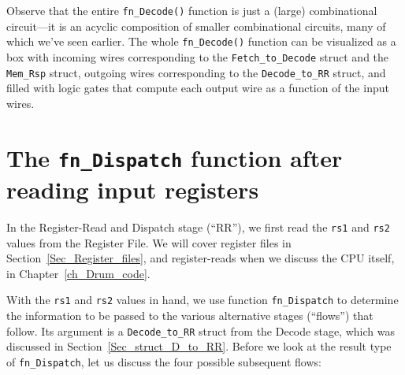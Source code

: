 Observe that the entire \verb|fn_Decode()| function is just a (large)
combinational circuit---it is an acyclic composition of smaller
combinational circuits, many of which we've seen earlier.  The whole
\verb|fn_Decode()| function can be visualized as a box with incoming
wires corresponding to the \verb|Fetch_to_Decode| struct and the
\verb|Mem_Rsp| struct, outgoing wires corresponding to the
\verb|Decode_to_RR| struct, and filled with logic gates that compute
each output wire as a function of the input wires.




\section{The {\tt fn\_Dispatch} function after reading input registers}

\label{Sec_fn_Dispatch}


In the Register-Read and Dispatch stage (``RR''), we first read the
\verb|rs1| and \verb|rs2| values from the Register File.  We will
cover register files in Section~\ref{Sec_Register_files}, and
register-reads when we discuss the {\DRUM} CPU itself, in
Chapter~\ref{ch_Drum_code}.

With the \verb|rs1| and \verb|rs2| values in hand, we use function
\verb|fn_Dispatch| to determine the information to be passed to the
various alternative stages (``flows'') that follow.  Its argument is a
\verb|Decode_to_RR| struct from the Decode stage, which was discussed
in Section~\ref{Sec_struct_D_to_RR}.  Before we look at the result
type of \verb|fn_Dispatch|, let us discuss the four possible
subsequent flows:

